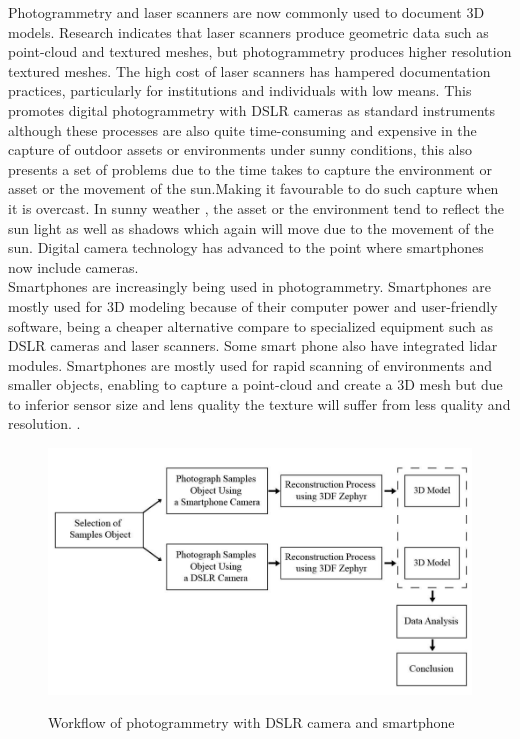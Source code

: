 \noindent Photogrammetry and laser scanners are now commonly used to document 3D models. Research indicates that laser scanners produce geometric data such as point-cloud and textured meshes, but photogrammetry produces higher resolution textured meshes. The high cost of laser scanners has hampered documentation practices, particularly for institutions and individuals with low means. This promotes digital photogrammetry with DSLR cameras as standard instruments although these processes are also quite time-consuming and expensive in the capture of outdoor assets or environments under sunny conditions, this also presents a set of problems due to the time takes to capture the environment or asset or the movement of the sun.Making it favourable to do such capture when it is overcast. In sunny weather , the asset or the environment tend to reflect the sun light as well as shadows which again will move due to the movement of the sun. Digital camera technology has advanced to the point where smartphones now include cameras\cite{samosir2020comparison}. \\ Smartphones are increasingly being used in photogrammetry. Smartphones are mostly used for 3D modeling because of their computer power and user-friendly software, being a cheaper alternative compare to specialized equipment such as DSLR cameras and laser scanners. Some smart phone also have integrated lidar modules. Smartphones are mostly used for rapid scanning of environments and smaller objects, enabling to capture a point-cloud and create a 3D mesh but due to inferior sensor size and lens quality the texture will suffer from less quality and resolution. \cite{Jasińska2023}. 


\begin{figure}[H]
  \centering
  \includegraphics[width=1.01\textwidth]{Figures/Photogrammetry with DSLR Camera and Smartphone.PNG}
  \caption[Workflow of photogrammetry with DSLR camera and smartphone]{Workflow of photogrammetry with DSLR camera and smartphone} \cite{samosir2020comparison}
  \label{fig:photogrammetry with DSLR camera and smartphone}
\end{figure}

